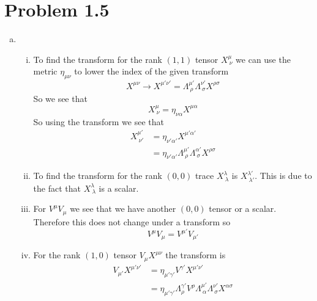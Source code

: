 \documentclass[11pt]{article}
\numberwithin{equation}{section}
\begin{document}
\section{Problem 1.5}
\begin{enumerate}[(a)]
\item
\begin{enumerate}[(i)]
\item
To find the transform for the rank $(1,1)$ tensor $X^{\mu}_{\ \nu}$ we can use the metric $\eta_{\mu\nu}$ to lower the index of the given transform
$$X^{\mu\nu} \rightarrow X^{\mu'\nu'} = \Lambda^{\mu'}_{\ \rho}\Lambda^{\nu'}_{\ \sigma}X^{\rho\sigma}$$
So we see that 
$$X^{\mu}_{\ \nu} = \eta_{\nu\alpha}X^{\mu\alpha}$$
So using the transform we see that
\begin{align*}
X^{\mu'}_{\ \nu'} &= \eta_{\nu'\alpha'}X^{\mu'\alpha'}\\
&= \eta_{\nu'\alpha'}\Lambda^{\mu'}_{\ \rho}\Lambda^{\alpha'}_{\ \sigma}X^{\rho\sigma}
\end{align*}

\item
To find the transform for the rank $(0,0)$ trace $X^{\lambda}_{\ \lambda}$ is $X^{\lambda'}_{\ \lambda'}$. This is due to the fact that $X^{\lambda}_{\ \lambda}$ is a scalar.

\item
For $V^{\mu}V_{\mu}$ we see that we have another $(0,0)$ tensor or a scalar. Therefore this does not change under a transform so
$$V^{\mu}V_{\mu} = V^{\mu'}V_{\mu'}$$  

\item
For the rank $(1,0)$ tensor $V_{\mu}X^{\mu\nu}$ the transform is
\begin{align*}
V_{\mu'}X^{\mu'\nu'} &= \eta_{\mu'\gamma'}V^{\gamma'}X^{\mu'\nu'}\\
&= \eta_{\mu'\gamma'}\Lambda^{\gamma'}_{\rho}V^{\rho}\Lambda^{\mu'}_{\ \alpha}\Lambda^{\nu'}_{\ \sigma}X^{\alpha\sigma}
\end{align*}
\end{enumerate}


\end{enumerate}
\end{document}
